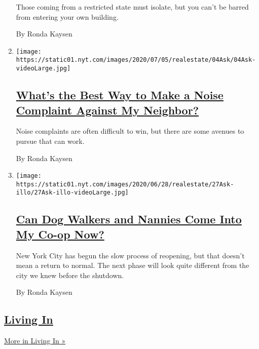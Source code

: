 \begin{enumerate}
  Those coming from a restricted state must isolate, but you can't be
  barred from entering your own building.

  By Ronda Kaysen
\item
  \texttt{[image: https://static01.nyt.com/images/2020/07/05/realestate/04Ask/04Ask-videoLarge.jpg]}

  \hypertarget{whats-the-best-way-to-make-a-noise-complaint-against-my-neighbor}{%
  \subsection{\texorpdfstring{\href{/2020/07/04/realestate/whats-the-best-way-to-make-a-noise-complaint-against-my-neighbor.html}{What's
  the Best Way to Make a Noise Complaint Against My
  Neighbor?}}{What's the Best Way to Make a Noise Complaint Against My Neighbor?}}\label{whats-the-best-way-to-make-a-noise-complaint-against-my-neighbor}}

  Noise complaints are often difficult to win, but there are some
  avenues to pursue that can work.

  By Ronda Kaysen
\item
  \texttt{[image: https://static01.nyt.com/images/2020/06/28/realestate/27Ask-illo/27Ask-illo-videoLarge.jpg]}

  \hypertarget{can-dog-walkers-and-nannies-come-into-my-co-op-now}{%
  \subsection{\texorpdfstring{\href{/2020/06/29/realestate/coronavirus-phase-2-dog-walkers-nannies-co-op.html}{Can
  Dog Walkers and Nannies Come Into My Co-op
  Now?}}{Can Dog Walkers and Nannies Come Into My Co-op Now?}}\label{can-dog-walkers-and-nannies-come-into-my-co-op-now}}

  New York City has begun the slow process of reopening, but that
  doesn't mean a return to normal. The next phase will look quite
  different from the city we knew before the shutdown.

  By Ronda Kaysen
\end{enumerate}

\hypertarget{living-in-1}{%
\subsection{\texorpdfstring{\href{/column/living-in}{Living
In}}{Living In}}\label{living-in-1}}

\href{/column/living-in}{More in Living In »}

